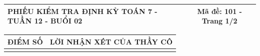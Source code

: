 \documentclass[12pt,a4paper]{article}
\begin{document}
\pagestyle{empty}
\noindent
\begin{tabularx}{\linewidth}{|X|c|}
\hline
\textbf{PHIẾU KIỂM TRA ĐỊNH KỲ TOÁN 7 - TUẦN 12 - BUỔI 02} & \textbf{Mã đề: 101 - Trang 1/2} \\
\hline
\end{tabularx}

\vspace{1.0mm}

\noindent
\begin{tabularx}{\linewidth}{|p{3.2cm}|X|}
\hline
\centering\textbf{ĐIỂM SỐ} & \centering\textbf{LỜI NHẬN XÉT CỦA THẦY CÔ} \tabularnewline
\hline
\rule{0pt}{1.8cm} & \tabularnewline
\hline
\end{tabularx}
\end{document}
